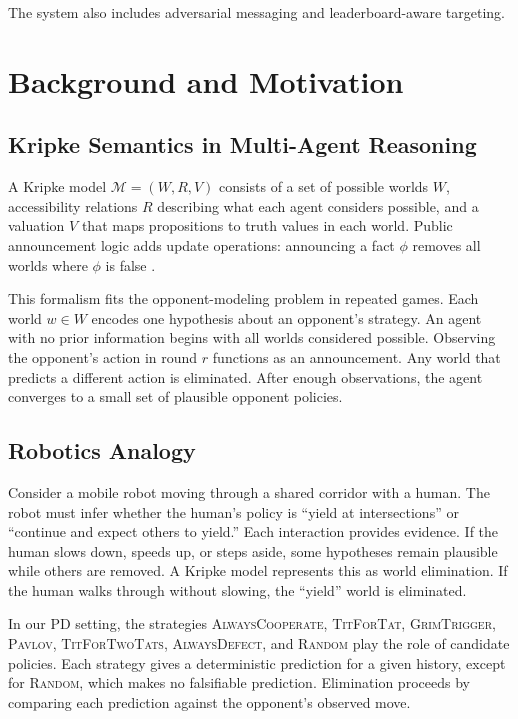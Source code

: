 \documentclass[11pt]{article}
\begin{document}
The system also includes adversarial messaging and leaderboard-aware targeting.

\section{Background and Motivation}

\subsection{Kripke Semantics in Multi-Agent Reasoning}

A Kripke model $\mathcal{M} = (W, R, V)$ consists of a set of possible worlds $W$,
accessibility relations $R$ describing what each agent considers possible, and a valuation
$V$ that maps propositions to truth values in each world. Public announcement logic adds
update operations: announcing a fact $\phi$ removes all worlds where $\phi$ is false
\cite{plaza1989logics}.

This formalism fits the opponent-modeling problem in repeated games. Each world $w \in W$
encodes one hypothesis about an opponent's strategy. An agent with no prior information begins
with all worlds considered possible. Observing the opponent's action in round $r$ functions
as an announcement. Any world that predicts a different action is eliminated. After enough observations, the agent converges to a small set of plausible opponent policies.

\subsection{Robotics Analogy}

Consider a mobile robot moving through a shared corridor with a human. The robot must infer
whether the human's policy is ``yield at intersections'' or ``continue and expect others to
yield.'' Each interaction provides evidence. If the human slows down, speeds up, or steps
aside, some hypotheses remain plausible while others are removed. A Kripke model represents
this as world elimination. If the human walks through without slowing, the ``yield'' world is
eliminated.

In our PD setting, the strategies \textsc{AlwaysCooperate}, \textsc{TitForTat},
\textsc{GrimTrigger}, \textsc{Pavlov}, \textsc{TitForTwoTats}, \textsc{AlwaysDefect}, and
\textsc{Random} play the role of candidate policies. Each strategy gives a deterministic
prediction for a given history, except for \textsc{Random}, which makes no falsifiable
prediction. Elimination proceeds by comparing each prediction against the opponent's observed
move.
\end{document}
